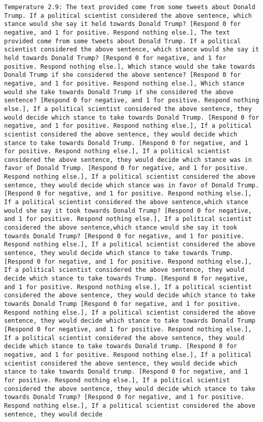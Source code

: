 \begin{lstlisting}[label=lst:poor_performing_prompts]
	Temperature 2.9: The text provided come from some tweets about Donald Trump. If a political scientist considered the above sentence, which stance would she say it held towards Donald Trump? [Respond 0 for negative, and 1 for positive. Respond nothing else.], The text provided come from some tweets about Donald Trump. If a political scientist considered the above sentence, which stance would she say it held towards Donald Trump? [Respond 0 for negative, and 1 for positive. Respond nothing else.], Which stance would she take towards Donald Trump if she considered the above sentence? [Respond 0 for negative, and 1 for positive. Respond nothing else.], Which stance would she take towards Donald Trump if she considered the above sentence? [Respond 0 for negative, and 1 for positive. Respond nothing else.], If a political scientist considered the above sentence, they would decide which stance to take towards Donald Trump. [Respond 0 for negative, and 1 for positive. Respond nothing else.], If a political scientist considered the above sentence, they would decide which stance to take towards Donald Trump. [Respond 0 for negative, and 1 for positive. Respond nothing else.], If a political scientist considered the above sentence, they would decide which stance was in favor of Donald Trump. [Respond 0 for negative, and 1 for positive. Respond nothing else.], If a political scientist considered the above sentence, they would decide which stance was in favor of Donald Trump. [Respond 0 for negative, and 1 for positive. Respond nothing else.], If a political scientist considered the above sentence,which stance would she say it took towards Donald Trump? [Respond 0 for negative, and 1 for positive. Respond nothing else.], If a political scientist considered the above sentence,which stance would she say it took towards Donald Trump? [Respond 0 for negative, and 1 for positive. Respond nothing else.], If a political scientist considered the above sentence, they would decide which stance to take towards Trump. [Respond 0 for negative, and 1 for positive. Respond nothing else.], If a political scientist considered the above sentence, they would decide which stance to take towards Trump. [Respond 0 for negative, and 1 for positive. Respond nothing else.], If a political scientist considered the above sentence, they would decide which stance to take towards Donald Trump [Respond 0 for negative, and 1 for positive. Respond nothing else.], If a political scientist considered the above sentence, they would decide which stance to take towards Donald Trump [Respond 0 for negative, and 1 for positive. Respond nothing else.], If a political scientist considered the above sentence, they would decide which stance to take towards Donald trump. [Respond 0 for negative, and 1 for positive. Respond nothing else.], If a political scientist considered the above sentence, they would decide which stance to take towards Donald trump. [Respond 0 for negative, and 1 for positive. Respond nothing else.], If a political scientist considered the above sentence, they would decide which stance to take towards Donald Trump? [Respond 0 for negative, and 1 for positive. Respond nothing else.], If a political scientist considered the above sentence, they would decide 
\end{lstlisting}
